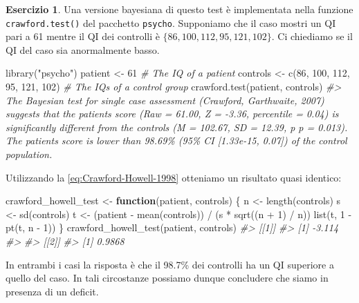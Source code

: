 \documentclass[
  11pt,
]{krantz}
\makeatletter
\newenvironment{Shaded}{\begin{snugshade}}{\end{snugshade}}
\newcommand{\CommentTok}[1]{\textcolor[rgb]{0.37,0.37,0.37}{\textit{#1}}}
\newcommand{\ControlFlowTok}[1]{\textcolor[rgb]{0.27,0.27,0.27}{\textbf{#1}}}
\newcommand{\DecValTok}[1]{\textcolor[rgb]{0.06,0.06,0.06}{#1}}
\newcommand{\FunctionTok}[1]{\textcolor[rgb]{0,0,0}{#1}}
\newcommand{\NormalTok}[1]{#1}
\newcommand{\OtherTok}[1]{\textcolor[rgb]{0.37,0.37,0.37}{#1}}
\newcommand{\SpecialCharTok}[1]{\textcolor[rgb]{0,0,0}{#1}}
\newcommand{\StringTok}[1]{\textcolor[rgb]{0.5,0.5,0.5}{#1}}
\newenvironment{kframe}{%
\medskip{}
\setlength{\fboxsep}{.8em}
 \def\at@end@of@kframe{}%
 \ifinner\ifhmode%
  \def\at@end@of@kframe{\end{minipage}}%
  \begin{minipage}{\columnwidth}%
 \fi\fi%
 \def\FrameCommand##1{\hskip\@totalleftmargin \hskip-\fboxsep
 \colorbox{shadecolor}{##1}\hskip-\fboxsep
     \hskip-\linewidth \hskip-\@totalleftmargin \hskip\columnwidth}%
 \MakeFramed {\advance\hsize-\width
   \@totalleftmargin\z@ \linewidth\hsize
   \@setminipage}}%
 {\par\unskip\endMakeFramed%
 \at@end@of@kframe}
\renewenvironment{Shaded}{\begin{kframe}}{\end{kframe}}
\theoremstyle{definition}
\theoremstyle{definition}
\theoremstyle{definition}
\newtheorem{exercise}{Esercizio}[chapter]
\theoremstyle{definition}
\theoremstyle{remark}
\makeatother
\begin{document}
\begin{exercise}
Una versione bayesiana di questo test è implementata nella funzione \texttt{crawford.test()} del pacchetto \texttt{psycho}. Supponiamo che il caso mostri un QI pari a 61 mentre il QI dei controlli è \(\{86, 100, 112, 95, 121, 102\}\). Ci chiediamo se il QI del caso sia anormalmente basso.

\begin{Shaded}
\begin{Highlighting}[]
\FunctionTok{library}\NormalTok{(}\StringTok{"psycho"}\NormalTok{)}
\NormalTok{patient }\OtherTok{\textless{}{-}} \DecValTok{61} \CommentTok{\# The IQ of a patient}
\NormalTok{controls }\OtherTok{\textless{}{-}} \FunctionTok{c}\NormalTok{(}\DecValTok{86}\NormalTok{, }\DecValTok{100}\NormalTok{, }\DecValTok{112}\NormalTok{, }\DecValTok{95}\NormalTok{, }\DecValTok{121}\NormalTok{, }\DecValTok{102}\NormalTok{) }\CommentTok{\# The IQs of a control group}
\FunctionTok{crawford.test}\NormalTok{(patient, controls)}
\CommentTok{\#\textgreater{} The Bayesian test for single case assessment (Crawford, Garthwaite, 2007) suggests that the patient\textquotesingle{}s score (Raw = 61.00, Z = {-}3.36, percentile = 0.04) is significantly different from the controls (M = 102.67, SD = 12.39, p p = 0.013). The patient\textquotesingle{}s score is lower than 98.69\% (95\% CI [1.33e{-}15, 0.07]) of the control population.}
\end{Highlighting}
\end{Shaded}

Utilizzando la \eqref{eq:Crawford-Howell-1998} otteniamo un risultato quasi identico:

\begin{Shaded}
\begin{Highlighting}[]
\NormalTok{crawford\_howell\_test }\OtherTok{\textless{}{-}} \ControlFlowTok{function}\NormalTok{(patient, controls) \{}
\NormalTok{  n }\OtherTok{\textless{}{-}} \FunctionTok{length}\NormalTok{(controls)}
\NormalTok{  s }\OtherTok{\textless{}{-}} \FunctionTok{sd}\NormalTok{(controls)}
\NormalTok{  t }\OtherTok{\textless{}{-}}\NormalTok{ (patient }\SpecialCharTok{{-}} \FunctionTok{mean}\NormalTok{(controls)) }\SpecialCharTok{/}\NormalTok{ (s }\SpecialCharTok{*} \FunctionTok{sqrt}\NormalTok{((n }\SpecialCharTok{+} \DecValTok{1}\NormalTok{) }\SpecialCharTok{/}\NormalTok{ n))}
  \FunctionTok{list}\NormalTok{(t, }\DecValTok{1} \SpecialCharTok{{-}} \FunctionTok{pt}\NormalTok{(t, n }\SpecialCharTok{{-}} \DecValTok{1}\NormalTok{))}
\NormalTok{\}}
\FunctionTok{crawford\_howell\_test}\NormalTok{(patient, controls)}
\CommentTok{\#\textgreater{} [[1]]}
\CommentTok{\#\textgreater{} [1] {-}3.114}
\CommentTok{\#\textgreater{} }
\CommentTok{\#\textgreater{} [[2]]}
\CommentTok{\#\textgreater{} [1] 0.9868}
\end{Highlighting}
\end{Shaded}

In entrambi i casi la risposta è che il 98.7\% dei controlli ha un QI superiore a quello del caso. In tali circostanze possiamo dunque concludere che siamo in presenza di un deficit.
\end{exercise}
\end{document}
